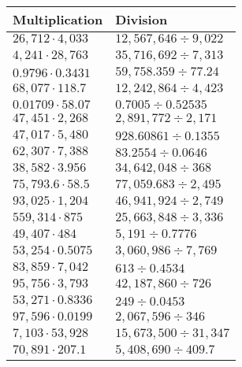 \begin{longtable}[]{@{}ll@{}}
\toprule
Multiplication & Division\tabularnewline
\midrule
\endhead
\(26,712\cdot4,033\) & \(12,567,646÷9,022\)\tabularnewline
\(4,241\cdot 28,763\) & \(35,716,692÷7,313\)\tabularnewline
\(0.9796\cdot0.3431\) & \(59,758.359÷77.24\)\tabularnewline
\(68,077\cdot118.7\) & \(12,242,864÷4,423\)\tabularnewline
\(0.01709\cdot58.07\) & \(0.7005÷0.52535\)\tabularnewline
\(47,451\cdot2,268\) & \(2,891,772÷2,171\)\tabularnewline
\(47,017\cdot5,480\) & \(928.60861÷0.1355\)\tabularnewline
\(62,307\cdot7,388\) & \(83.2554÷0.0646\)\tabularnewline
\(38,582\cdot3.956\) & \(34,642,048÷368\)\tabularnewline
\(75,793.6\cdot58.5\) & \(77,059.683÷2,495\)\tabularnewline
\(93,025\cdot1,204\) & \(46,941,924÷2,749\)\tabularnewline
\(559,314\cdot875\) & \(25,663,848÷3,336\)\tabularnewline
\(49,407\cdot484\) & \(5,191÷0.7776\)\tabularnewline
\(53,254\cdot0.5075\) & \(3,060,986÷7,769\)\tabularnewline
\(83,859\cdot7,042\) & \(613÷0.4534\)\tabularnewline
\(95,756\cdot3,793\) & \(42,187,860÷726\)\tabularnewline
\(53,271\cdot0.8336\) & \(249÷0.0453\)\tabularnewline
\(97,596\cdot0.0199\) & \(2,067,596÷346\)\tabularnewline
\(7,103\cdot53,928\) & \(15,673,500÷31,347\)\tabularnewline
\(70,891\cdot207.1\) & \(5,408,690÷409.7\)\tabularnewline
\bottomrule
\end{longtable}
